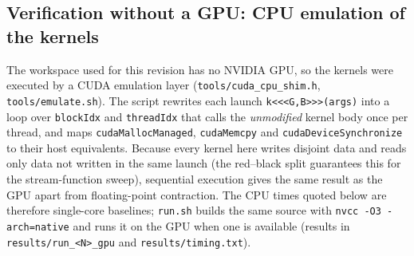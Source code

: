 \subsection{Verification without a GPU: CPU emulation of the kernels}
The workspace used for this revision has no NVIDIA GPU, so the kernels were executed by a CUDA emulation layer (\texttt{tools/cuda\_cpu\_shim.h}, \texttt{tools/emulate.sh}). The script rewrites each launch \texttt{k<<<G,B>>>(args)} into a loop over \texttt{blockIdx} and \texttt{threadIdx} that calls the \emph{unmodified} kernel body once per thread, and maps \texttt{cudaMallocManaged}, \texttt{cudaMemcpy} and \texttt{cudaDeviceSynchronize} to their host equivalents. Because every kernel here writes disjoint data and reads only data not written in the same launch (the red--black split guarantees this for the stream-function sweep), sequential execution gives the same result as the GPU apart from floating-point contraction. The CPU times quoted below are therefore single-core baselines; \texttt{run.sh} builds the same source with \texttt{nvcc -O3 -arch=native} and runs it on the GPU when one is available (results in \texttt{results/run\_<N>\_gpu} and \texttt{results/timing.txt}).

